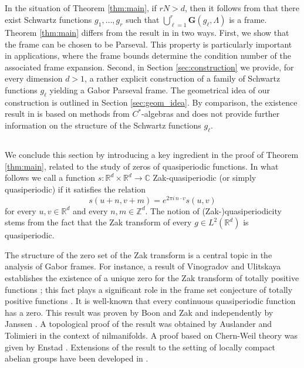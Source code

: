 \documentclass[reqno,a4paper,12pt]{amsart}
\numberwithin{equation}{section}
\def\R{{\mathbb R}}
\def\C{{\mathbb C}}
\newcommand{\Rd}{{\R^d}}
\newcommand{\ltd}{{L^2(\R^d)}}
\newcommand\1{\mathds{1}}
\begin{document}
\subsection{}
In the situation of Theorem \ref{thm:main}, if $rN>d$, then it follows from
\cite[Theorem D]{enstad2025criteria} that there exist Schwartz functions
$g_1,\dots,g_r$ such that
$
\bigcup_{\ell=1}^r \mathbf G(g_\ell,\Lambda)
$
is a frame. Theorem \ref{thm:main} differs from the result in
\cite{enstad2025criteria} in two ways. First, we show that the frame can be
chosen to be Parseval. This property is particularly important in applications,
where the frame bounds determine the condition number of the associated frame
expansion. Second, in Section \ref{sec:construction} we provide, for every
dimension $d>1$, a rather explicit construction of a family of Schwartz functions $g_\ell$ yielding a Gabor Parseval frame. The geometrical idea of our construction is outlined in Section \ref{sec:geom_idea}. By comparison, the existence result
in \cite{enstad2025criteria} is based on methods from $C^*$-algebras and does
not provide further information on the structure of the Schwartz functions
$g_\ell$.


\subsection{}
We conclude this section by introducing a key ingredient in the proof of Theorem \ref{thm:main}, related to the study of zeros of quasiperiodic functions. In what follows we call a function $s : \Rd \times \Rd \to \C$ Zak-quasiperiodic (or simply quasiperiodic) if it satisfies the relation \begin{equation}\label{eq:quasi_periodicity}
    s(u+n,v+m)=e^{2\pi i\,n\cdot v}s(u,v)
\end{equation}
for every $u,v\in\mathbb R^d$ and every
$n,m\in\mathbb Z^d$. The notion of (Zak-)quasiperiodicity stems from the fact that the Zak transform of every $g \in \ltd$ is quasiperiodic.

The structure of the zero set of the Zak transform is a central topic in the analysis of Gabor frames. For instance, a result of Vinogradov and Ulitskaya establishes the existence of a unique zero for the Zak transform of totally positive functions \cite{VINOGRADOV201755}; this fact plays a significant role in the frame set conjecture of totally positive functions \cite{grochenig2023totally,GroechenigRomeroStoeckler}. It is well-known that every continuous quasiperiodic function has a zero. This result was proven by Boon and Zak \cite{boon1981amplitudes} and independently by Janssen \cite{janssen1982bargmann}. A topological proof of the result was obtained by Auslander and Tolimieri \cite[Theorem II.2]{auslander2006abelian} in the context of nilmanifolds. A proof based on Chern-Weil theory was given by Enstad \cite[Example 5.6]{enstad2020balian}.
Extensions of the result to the setting of locally compact abelian groups have been developed in \cite{enstad2022deformations, kaniuth1998zeros}.
\end{document}
